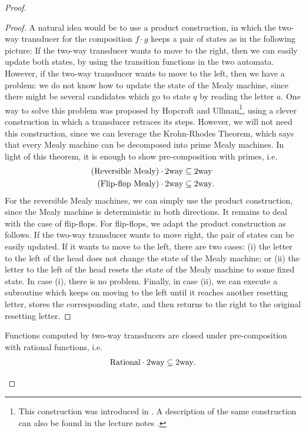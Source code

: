 \begin{proof}
    \begin{proof} 
        A natural idea would be to use a product construction, in which the two-way transducer for the composition $f \cdot g$ keeps a pair of states as in the following picture:
        If the two-way transducer wants to move to the right, then we can easily update both states, by using the transition functions in the two automata. However, if the two-way transducer wants to move to the left, then we have a problem: we do not know how to update the state of the Mealy machine, since there might be several candidates which go to state $q$ by reading the letter $a$.  One way to solve this problem was proposed by  Hopcroft and Ullman\footnote{This construction was introduced in  
        \cite[Lemma 3]{hopcroftUllman1967}.
        A description of the same construction can also be found in the lecture notes
        \cite[Lemma 17.4]{bojanczyk_automata_2025}.
        }, using a clever construction in which a transducer retraces its steps.  However, we will not need this construction, since we can leverage the Krohn-Rhodes Theorem, which says that every Mealy machine can be decomposed into prime Mealy machines. In light of this theorem, it is enough to show pre-composition with primes, i.e.~
\begin{align*}\text{(Reversible Mealy)} \cdot \mathrm{2way} 
& \subseteq \mathrm{2way} \\
\text{(Flip-flop Mealy)} \cdot \mathrm{2way} 
& \subseteq \mathrm{2way}.
\end{align*}
For the reversible Mealy machines, we can simply use the product construction, since the Mealy machine is deterministic in both directions. It remains to deal with the case of flip-flops. For flip-flops, we adapt the product construction as follows. If the two-way transducer wants to move right, the pair of states can be easily updated. If it wants to move to the left, there are two cases: (i) the letter to the left of the head does not change the state of the Mealy machine; or (ii) the letter to the left of the head resets the state of the Mealy machine to some fixed state. In case (i), there is no problem. Finally, in case (ii), we can execute a subroutine which keeps on moving to the left until it reaches another resetting letter, stores the corresponding state, and then returns to the right to the original resetting letter.
    \end{proof}

    \begin{corollary}\label{cor:2dfa-closure-under-composition}
        Functions computed by two-way transducers are closed under pre-composition with rational functions, i.e.~
        \begin{align*}        \mathrm{Rational} \cdot \mathrm{2way} 
        \subseteq \mathrm{2way}.   
        \end{align*}
    \end{corollary}


\end{proof}
